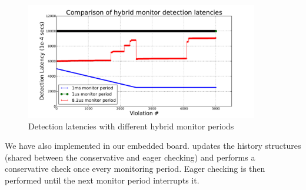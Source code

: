\begin{figure}[t]
\centering
\includegraphics[width=4in]{img/hybrid_comp}
\caption{Detection latencies with different hybrid monitor periods\label{fig:hybrid_comp}}
\end{figure}
%
%
%
%
%
We have also implemented \ha in our embedded board.
\ha updates the history structures (shared between the conservative and eager checking) and performs a conservative check once every monitoring period.
Eager checking is then performed until the next monitor period interrupts it.


